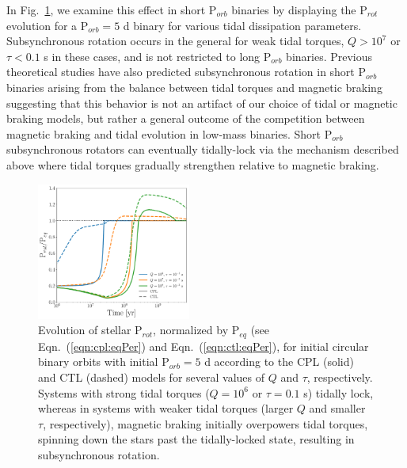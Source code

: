 \documentclass[twocolumn]{aastex61}
\begin{document}
In Fig.~\ref{fig:eqPerShortPorb}, we examine this effect in short P$_{orb}$ binaries by displaying the P$_{rot}$ evolution for a P$_{orb} = 5$ d binary for various tidal dissipation parameters. Subsynchronous rotation occurs in the general for weak tidal torques, $Q>10^7$ or $\tau < 0.1$ s in these cases, and is not restricted to long P$_{orb}$ binaries. Previous theoretical studies have also predicted subsynchronous rotation in short P$_{orb}$ binaries arising from the balance between tidal torques and magnetic braking \citep[e.g.][]{Habets1989,Zahn1994,Keppens1997} suggesting that this behavior is not an artifact of our choice of tidal or magnetic braking models, but rather a general outcome of the competition between magnetic braking and tidal evolution in low-mass binaries.  Short P$_{orb}$ subsynchronous rotators can eventually tidally-lock via the mechanism described above where tidal torques gradually strengthen relative to magnetic braking. 

\begin{figure}
	\includegraphics[width=0.45\textwidth]{../Plots/eqPerShortPorb.pdf}
   \caption{Evolution of stellar P$_{rot}$, normalized by P$_{eq}$ (see Eqn.~(\ref{eqn:cpl:eqPer}) and Eqn.~(\ref{eqn:ctl:eqPer}), for initial circular binary orbits with initial P$_{orb} = 5$ d according to the CPL (solid) and CTL (dashed) models for several values of $Q$ and $\tau$, respectively. Systems with strong tidal torques ($Q = 10^6$ or $\tau = 0.1$ s) tidally lock, whereas in systems with weaker tidal torques (larger $Q$ and smaller $\tau$, respectively), magnetic braking initially overpowers tidal torques, spinning down the stars past the tidally-locked state, resulting in subsynchronous rotation. }%
    \label{fig:eqPerShortPorb}%
\end{figure}

\end{document}
